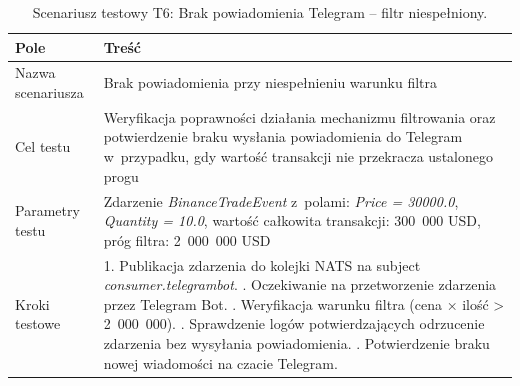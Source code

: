 \begin{table}[H]
    \centering
    \caption{Scenariusz testowy T6: Brak powiadomienia Telegram -- filtr niespełniony.}
    \label{tab:test_telegram_filter_fail}
    \begin{tabular}{|p{}|p{}|}
        \hline
        \textbf{Pole}        & \textbf{Treść}                                                                                                                                                                                                                                                                                                                                                                                    \\ \hline
        Nazwa scenariusza    & Brak powiadomienia przy niespełnieniu warunku filtra                                                                                                                                                                                                                                                                                                                                              \\ \hline
        Cel testu            & Weryfikacja poprawności działania mechanizmu filtrowania oraz potwierdzenie braku wysłania powiadomienia do Telegram w~przypadku, gdy wartość transakcji nie przekracza ustalonego progu                                                                                                                                                                                                          \\ \hline
        Parametry testu      & Zdarzenie \textit{BinanceTradeEvent} z~polami: \textit{Price = 30000.0}, \textit{Quantity = 10.0}, wartość całkowita transakcji: 300~000 USD, próg filtra: 2~000~000 USD                                                                                                                                                                                                                          \\ \hline
        Kroki testowe        & 1. Publikacja zdarzenia do kolejki NATS na subject \textit{consumer.telegrambot}. \newline 2. Oczekiwanie na przetworzenie zdarzenia przez Telegram Bot. \newline 3. Weryfikacja warunku filtra (cena × ilość > 2~000~000). \newline 4. Sprawdzenie logów potwierdzających odrzucenie zdarzenia bez wysyłania powiadomienia. \newline 5. Potwierdzenie braku nowej wiadomości na czacie Telegram. \\ \hline

\end{tabular}
\end{table}
